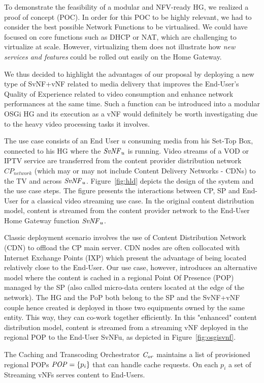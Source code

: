 To demonstrate the feasibility of a modular and NFV-ready HG, we realized a proof of concept (POC).
In order for this POC to be highly relevant, we had to consider the best possible Network Functions to be virtualised.
We could have focused on core functions such as DHCP or NAT, which are challenging to virtualize at scale. However, virtualizing them does not illustrate how \textit{new services and features} could be rolled out easily on the Home Gateway.

We thus decided to highlight the advantages of our proposal by deploying a new type of SvNF+vNF related to media delivery that improves the End-User's Quality of Experience related to video consumption and enhance network performances at the same time.
Such a function can be introduced into a modular OSGi HG and its execution as a vNF would definitely be worth investigating due to the heavy video processing tasks it involves.


The use case consists of an End User $u$ consuming media from his Set-Top Box, connected to his HG where the $\mathit{SvNF}_{u}$ is running.
Video streams of a VOD or IPTV service are transferred from the content provider distribution network \(\mathit{CP}_{\mathit{network}}\) (which may or may not include Content Delivery Networks - CDNs) to the TV and across $\mathit{SvNF}_{u}$.
Figure~\ref{fig:hld} depicts the design of the system and the use case steps. The figure presents the interactions between CP, SP and End-User for a classical video streaming use case.
In the original content distribution model, content is streamed from the content provider network to the End-User Home Gateway function \(\mathit{SvNF}_{u}\).

Classic deployment scenario involves the use of Content Distribution Network (CDN) to offload the CP main server.
CDN nodes are often collocated with Internet Exchange Points (IXP) which present the advantage of being located relatively close to the End-User. Our use case, however, introduces an alternative model where the content is cached in a regional Point Of Presence (POP) managed by the SP (also called micro-data centers located at the edge of the network). The HG and the PoP both belong to the SP and the SvNF+vNF couple hence created is deployed in those two equipments owned by the same entity. This way, they can co-work together efficiently. In this "enhanced" content distribution model, content is streamed from a streaming vNF deployed in the regional POP to the End-User SvNFu, as depicted in Figure~\ref{fig:osgisvnf}.

The Caching and Transcoding Orchestrator  $\mathit{C_{or}}$ maintains a list of provisioned regional POPs \(\mathit{POP}=\{p_{i}\}\) that can handle cache requests. On each $p_{i}$ a set of Streaming vNFs serves content to End-Users.

